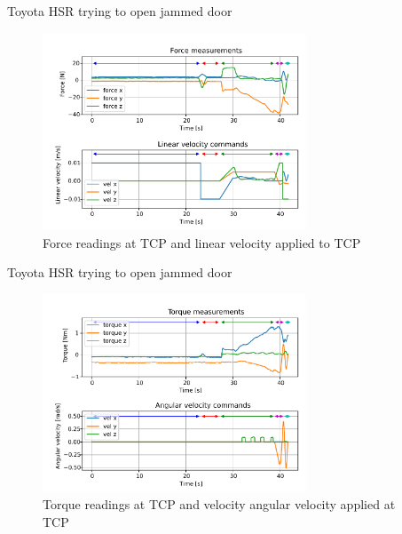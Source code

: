 \documentclass[aspectratio=169]{beamer}
\begin{document}
\begin{frame}
	Toyota HSR trying to open jammed door
	\vspace{-0.4cm}
	\begin{figure}[h]
		\centering
		\includegraphics[width=0.7\textwidth]{images/exp/8776_fn.pdf}
		\vspace{-0.3cm}
		\caption{Force readings at TCP and linear velocity applied to TCP}
	\end{figure}
\end{frame}


\begin{frame}
	Toyota HSR trying to open jammed door
	\vspace{-0.4cm}
	\begin{figure}[t]
		\centering
		\includegraphics[width=0.7\textwidth]{images/exp/8776n.pdf}
			\vspace{-0.3cm}
		\caption{Torque readings at TCP and velocity angular velocity applied at TCP}
		
	\end{figure}
\end{frame}
\end{document}

